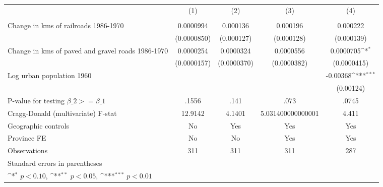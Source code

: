 {
\def\sym#1{\ifmmode^{#1}\else\(^{#1}\)\fi}
\begin{tabular}{l*{4}{c}}
\hline\hline
                &\multicolumn{1}{c}{(1)}&\multicolumn{1}{c}{(2)}&\multicolumn{1}{c}{(3)}&\multicolumn{1}{c}{(4)}\\
                &\multicolumn{1}{c}{}&\multicolumn{1}{c}{}&\multicolumn{1}{c}{}&\multicolumn{1}{c}{}\\
\hline
Change in kms of railroads 1986-1970&0.0000994         & 0.000136         & 0.000196         & 0.000222         \\
                &(0.0000850)         &(0.000127)         &(0.000128)         &(0.000139)         \\
[1em]
Change in kms of paved and gravel roads 1986-1970&0.0000254         &0.0000324         &0.0000556         &0.0000705\sym{*}  \\
                &(0.0000157)         &(0.0000370)         &(0.0000382)         &(0.0000415)         \\
[1em]
Log urban population 1960&                  &                  &                  & -0.00368\sym{***}\\
                &                  &                  &                  &(0.00124)         \\
\hline
P-value for testing $\beta\_{2} >= \beta\_{1}$&    .1556         &     .141         &     .073         &    .0745         \\
Cragg-Donald (multivariate) F-stat&  12.9142         &   4.1401         &5.031400000000001         &    4.411         \\
Geographic controls&       No         &      Yes         &      Yes         &      Yes         \\
Province FE     &       No         &       No         &      Yes         &      Yes         \\
Observations    &      311         &      311         &      311         &      287         \\
\hline\hline
\multicolumn{5}{l}{\footnotesize Standard errors in parentheses}\\
\multicolumn{5}{l}{\footnotesize \sym{*} \(p<0.10\), \sym{**} \(p<0.05\), \sym{***} \(p<0.01\)}\\
\end{tabular}
}
